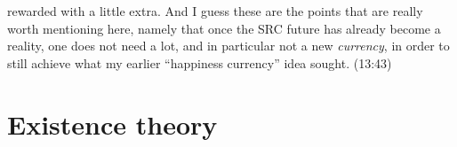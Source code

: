 \documentclass{report}
\begin{document}
rewarded with a little extra. And I guess these are the points that are really worth mentioning here, namely that once the SRC future has already become a reality, one does not need a lot, and in particular not a new \emph{currency}, in order to still achieve what my earlier ``happiness currency'' idea sought. (13:43)
















\chapter{Existence theory}
\end{document}
